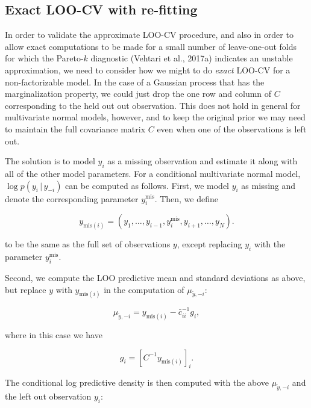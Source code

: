 \documentclass[english,,doc,floatsintext]{apa6}
\theoremstyle{definition}
\theoremstyle{definition}
\theoremstyle{definition}
\theoremstyle{remark}
\begin{document}
\hypertarget{exact-loo-cv-with-re-fitting}{%
\subsection{Exact LOO-CV with
re-fitting}\label{exact-loo-cv-with-re-fitting}}

In order to validate the approximate LOO-CV procedure, and also in order
to allow exact computations to be made for a small number of
leave-one-out folds for which the Pareto-\(k\) diagnostic (Vehtari et
al., 2017a) indicates an unstable approximation, we need to consider how
we might to do \emph{exact} LOO-CV for a non-factorizable model. In the
case of a Gaussian process that has the marginalization property, we
could just drop the one row and column of \(C\) corresponding to the
held out out observation. This does not hold in general for multivariate
normal models, however, and to keep the original prior we may need to
maintain the full covariance matrix \(C\) even when one of the
observations is left out.

The solution is to model \(y_i\) as a missing observation and estimate
it along with all of the other model parameters. For a conditional
multivariate normal model, \(\log p(y_i\,|\,y_{-i})\) can be computed as
follows. First, we model \(y_i\) as missing and denote the corresponding
parameter \(y_i^{\mathrm{mis}}\). Then, we define

\begin{equation}
y_{\mathrm{mis}(i)} = (y_1, \ldots, y_{i-1}, y_i^{\mathrm{mis}}, y_{i+1}, \ldots, y_N).
\end{equation}

to be the same as the full set of observations \(y\), except replacing
\(y_i\) with the parameter \(y_i^{\mathrm{mis}}\).

Second, we compute the LOO predictive mean and standard deviations as
above, but replace \(y\) with \(y_{\mathrm{mis}(i)}\) in the computation
of \(\mu_{\tilde{y},-i}\):

\begin{equation}
\mu_{\tilde{y},-i} = y_{{\mathrm{mis}}(i)}-\bar{c}_{ii}^{-1}g_i,
\end{equation}

where in this case we have

\begin{equation}
g_i = \left[ C^{-1} y_{\mathrm{mis}(i)} \right]_i.
\end{equation}

The conditional log predictive density is then computed with the above
\(\mu_{\tilde{y},-i}\) and the left out observation \(y_i\):
\end{document}
